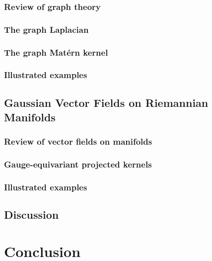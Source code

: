 \documentclass[11pt]{book}
\begin{document}
\subsection{Review of graph theory}
\subsection{The graph Laplacian}
\subsection{The graph Matérn kernel}
\subsection{Illustrated examples}

\section{Gaussian Vector Fields on Riemannian Manifolds}

\subsection{Review of vector fields on manifolds}
\subsection{Gauge-equivariant projected kernels}
\subsection{Illustrated examples}

\section{Discussion}
\label{sec:noneuclidean-discussion}





\chapter{Conclusion}
\label{ch:conclusion}

\printbibliography
\end{document}

